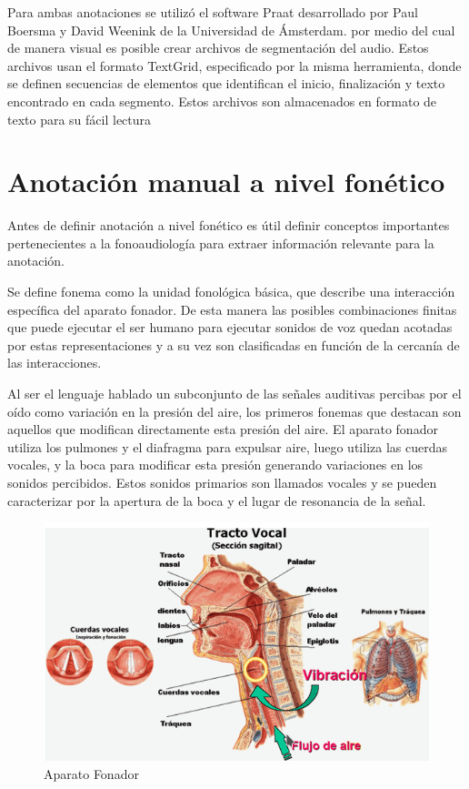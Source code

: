 \documentclass[a4paper,12pt,twoside]{report}
\begin{document}
Para ambas anotaciones se utilizó el software Praat \cite{Praat} desarrollado por Paul Boersma y David Weenink de la Universidad de Ámsterdam. por medio del cual de manera visual es posible crear archivos de segmentación del audio. Estos archivos usan el formato TextGrid, especificado por la misma herramienta, donde se definen secuencias de elementos que identifican el inicio, finalización y texto encontrado en cada segmento. Estos archivos son almacenados en formato de texto para su fácil lectura \cite{TextGrids}

\section{Anotación manual a nivel fonético}

Antes de definir anotación a nivel fonético es útil definir conceptos importantes pertenecientes a la fonoaudiología para extraer información relevante para la anotación.

Se define fonema como la unidad fonológica básica, que describe una interacción específica del aparato fonador. De esta manera las posibles combinaciones finitas que puede ejecutar el ser humano para ejecutar sonidos de voz quedan acotadas por estas representaciones y a su vez son clasificadas en función de la cercanía de las interacciones.

Al ser el lenguaje hablado un subconjunto de las señales auditivas percibas por el oído como variación en la presión del aire, los primeros fonemas que destacan son aquellos que modifican directamente esta presión del aire. El aparato fonador utiliza los pulmones y el diafragma para expulsar aire, luego utiliza las cuerdas vocales, y la boca para modificar esta presión generando variaciones en los sonidos percibidos. Estos sonidos primarios son llamados vocales y se pueden caracterizar por la apertura de la boca y el lugar de resonancia de la señal.

\begin{figure}[H]
\caption{Aparato Fonador\cite{hableomsDeVoz}}
\label{img:aparato_fonador}
\includegraphics[width=\textwidth]{imagenes/03_02_aparato_fonador.png}
\end{figure}
\end{document}
